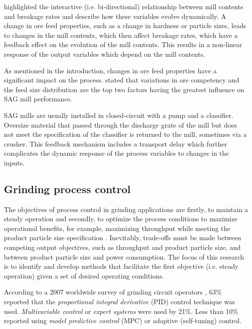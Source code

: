 \cite{powell_applying_2009} highlighted the interactive (i.e. bi-directional) relationship between mill contents and breakage rates and describe how these variables evolve dynamically. A change in ore feed properties, such as a change in hardness or particle sizes, leads to changes in the mill contents, which then affect breakage rates, which have a feedback effect on the evolution of the mill contents. This results in a non-linear response of the output variables which depend on the mill contents.

As mentioned in the introduction, changes in ore feed properties have a significant impact on the process. \cite{morrell_influence_2001} stated that variations in ore competency and the feed size distribution are the top two factors having the greatest influence on \gls{SAG} mill performance.

\gls{SAG} mills are usually installed in closed-circuit with a pump and a classifier. Oversize material that passed through the discharge grate of the mill but does not meet the specification of the classifier is returned to the mill, sometimes via a crusher. This feedback mechanism includes a transport delay which further complicates the dynamic response of the process variables to changes in the inputs.

\subsection{Grinding process control}

The objectives of process control in grinding applications are firstly, to maintain a steady operation and secondly, to optimize the process conditions to maximize operational benefits, for example, maximizing throughput while meeting the product particle size specification \citep{wei_grinding_2009}. Inevitably, trade-offs must be made between competing output objectives, such as throughput and product particle size, and between product particle size and power consumption. The focus of this research is to identify and develop methods that facilitate the first objective (i.e. steady operation) given a set of desired operating conditions.

According to a 2007 worldwide survey of grinding circuit operators \citep{wei_grinding_2009}, 63\% reported that the \textit{proportional integral derivative} (PID) control technique was used. \textit{Multivariable control} or \textit{expert systems} were used by 21\%. Less than 10\% reported using \textit{model predictive control} (\gls{MPC}) or adaptive (self-tuning) control.

